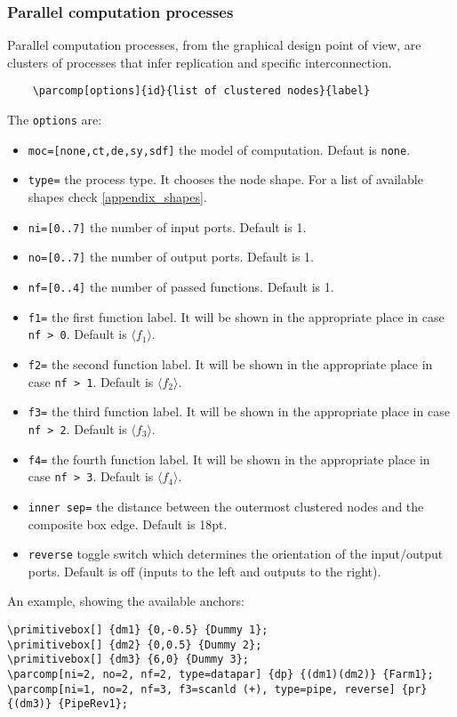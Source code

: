 \documentclass[10pt]{article}
\begin{document}
\subsubsection{Parallel computation processes}

Parallel computation processes, from the graphical design point of view, are clusters of processes that infer replication and specific interconnection.

\begin{verbatim}
	\parcomp[options]{id}{list of clustered nodes}{label}
\end{verbatim}

The \texttt{options} are:
\begin{itemize}
\item \texttt{moc=[none,ct,de,sy,sdf]} the model of computation. Defaut is \texttt{none}.
\item \texttt{type=} the process type. It chooses the node shape. For a list of available shapes check \autoref{appendix_shapes}.
\item \texttt{ni=[0..7]} the number of input ports. Default is 1.
\item \texttt{no=[0..7]} the number of output ports. Default is 1.
\item \texttt{nf=[0..4]} the number of passed functions. Default is 1.
\item \texttt{f1=} the first function label. It will be shown in the appropriate place in case \texttt{nf > 0}. Default is $\langle f_1 \rangle$.
\item \texttt{f2=} the second function label. It will be shown in the appropriate place in case \texttt{nf > 1}. Default is $\langle f_2 \rangle$.
\item \texttt{f3=} the third function label. It will be shown in the appropriate place in case \texttt{nf > 2}. Default is $\langle f_3 \rangle$.
\item \texttt{f4=} the fourth function label. It will be shown in the appropriate place in case \texttt{nf > 3}. Default is $\langle f_4 \rangle$.
\item\texttt{inner sep=} the distance between the outermost clustered nodes and the composite box edge. Default is 18pt.
\item\texttt{reverse} toggle switch which determines the orientation of the input/output ports. Default is off (inputs to the left and outputs to the right).
\end{itemize}

An example, showing the available anchors:
\begin{verbatim}
\primitivebox[] {dm1} {0,-0.5} {Dummy 1};
\primitivebox[] {dm2} {0,0.5} {Dummy 2};
\primitivebox[] {dm3} {6,0} {Dummy 3};
\parcomp[ni=2, no=2, nf=2, type=datapar] {dp} {(dm1)(dm2)} {Farm1};
\parcomp[ni=1, no=2, nf=3, f3=scanld (+), type=pipe, reverse] {pr} {(dm3)} {PipeRev1};
\end{verbatim}
\end{document}
